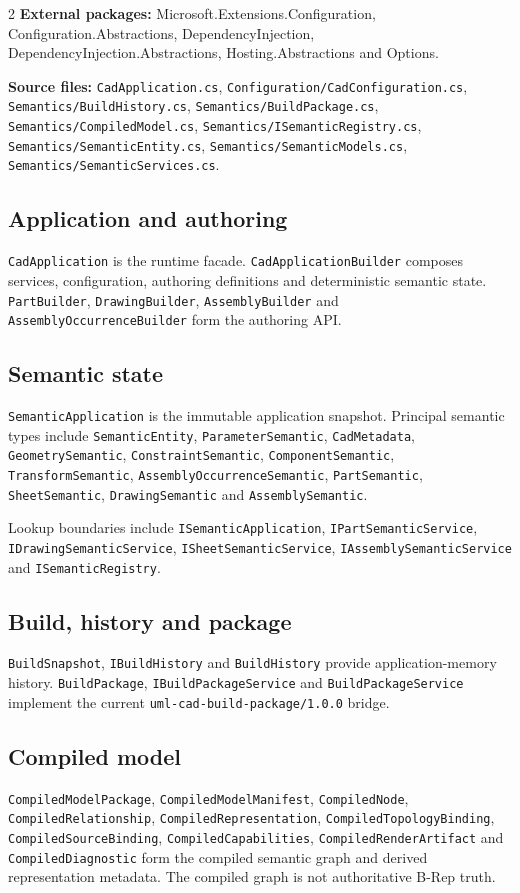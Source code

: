 \documentclass[10pt,a4paper]{article}
\newcommand{\code}[1]{\nolinkurl{#1}}
\begin{document}
\begin{multicols}{2}
\textbf{External packages:} Microsoft.Extensions.Configuration, Configuration.Abstractions, DependencyInjection, DependencyInjection.Abstractions, Hosting.Abstractions and Options.

\textbf{Source files:} \code{CadApplication.cs}, \code{Configuration/CadConfiguration.cs}, \code{Semantics/BuildHistory.cs}, \code{Semantics/BuildPackage.cs}, \code{Semantics/CompiledModel.cs}, \code{Semantics/ISemanticRegistry.cs}, \code{Semantics/SemanticEntity.cs}, \code{Semantics/SemanticModels.cs}, \code{Semantics/SemanticServices.cs}.

\subsection{Application and authoring}
\code{CadApplication} is the runtime facade. \code{CadApplicationBuilder} composes services, configuration, authoring definitions and deterministic semantic state. \code{PartBuilder}, \code{DrawingBuilder}, \code{AssemblyBuilder} and \code{AssemblyOccurrenceBuilder} form the authoring API.

\subsection{Semantic state}
\code{SemanticApplication} is the immutable application snapshot. Principal semantic types include \code{SemanticEntity}, \code{ParameterSemantic}, \code{CadMetadata}, \code{GeometrySemantic}, \code{ConstraintSemantic}, \code{ComponentSemantic}, \code{TransformSemantic}, \code{AssemblyOccurrenceSemantic}, \code{PartSemantic}, \code{SheetSemantic}, \code{DrawingSemantic} and \code{AssemblySemantic}.

Lookup boundaries include \code{ISemanticApplication}, \code{IPartSemanticService}, \code{IDrawingSemanticService}, \code{ISheetSemanticService}, \code{IAssemblySemanticService} and \code{ISemanticRegistry}.

\subsection{Build, history and package}
\code{BuildSnapshot}, \code{IBuildHistory} and \code{BuildHistory} provide application-memory history. \code{BuildPackage}, \code{IBuildPackageService} and \code{BuildPackageService} implement the current \code{uml-cad-build-package/1.0.0} bridge.

\subsection{Compiled model}
\code{CompiledModelPackage}, \code{CompiledModelManifest}, \code{CompiledNode}, \code{CompiledRelationship}, \code{CompiledRepresentation}, \code{CompiledTopologyBinding}, \code{CompiledSourceBinding}, \code{CompiledCapabilities}, \code{CompiledRenderArtifact} and \code{CompiledDiagnostic} form the compiled semantic graph and derived representation metadata. The compiled graph is not authoritative B-Rep truth.


\end{multicols}
\end{document}

